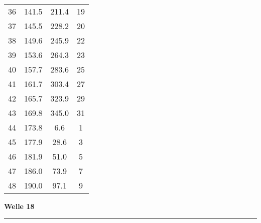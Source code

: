 \documentclass[10pt, a4paper]{article}
\begin{document}
\begin{center}
\begin{tabular}{c|c|c|c}
		36 & 141.5 & 211.4 & 19 \\
		37 & 145.5 & 228.2 & 20 \\
		38 & 149.6 & 245.9 & 22 \\
		39 & 153.6 & 264.3 & 23 \\
		40 & 157.7 & 283.6 & 25 \\
		41 & 161.7 & 303.4 & 27 \\
		42 & 165.7 & 323.9 & 29 \\
		43 & 169.8 & 345.0 & 31 \\
		44 & 173.8 & 6.6 & 1 \\
		45 & 177.9 & 28.6 & 3 \\
		46 & 181.9 & 51.0 & 5 \\
		47 & 186.0 & 73.9 & 7 \\
		48 & 190.0 & 97.1 & 9 \\
	\end{tabular}
\end{center}
\newpage
\centerline{{\bf Welle 18} }
\rule{1.0\textwidth}{0.5mm}
\end{document}
